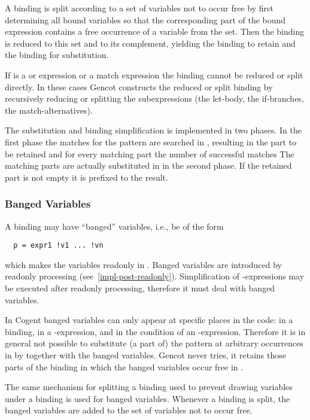 A binding is split according to a set of variables not to occur free by first determining all bound variables so that the 
corresponding part of the bound expression contains a free occurrence of a variable from the set. Then the binding is reduced
to this set and to its complement, yielding the binding to retain and the binding for substitution.

If  is a  or  expression or a match expression the binding cannot be reduced or split directly.
In these cases Gencot constructs the reduced or split binding by recursively reducing or splitting the subexpressions (the 
let-body, the if-branches, the match-alternatives).

The substitution and binding simplification is implemented in two phases. In the first phase the matches for the pattern are 
searched in , resulting in the part to be retained and for every matching part the number of successful matches
The matching parts are actually substituted in  in the second phase. If the retained part is not empty it is 
prefixed to the result.

\subsubsection{Banged Variables}

A binding may have ``banged'' variables, i.e., be of the form
\begin{verbatim}
  p = expr1 !v1 ... !vn
\end{verbatim}
which makes the variables  readonly in . Banged variables are introduced by readonly processing 
(see~\ref{impl-post-readonly}). Simplification of -expressions may be executed after readonly processing, therefore it
must deal with banged variables.

In Cogent banged variables can only appear at specific places in the code: in a  binding, in a -expression, 
and in the condition of an -expression. Therefore it is in general not possible to substitute (a part of) the pattern 
at arbitrary occurrences in  by  together with the banged variables. Gencot never tries, it retains those
parts of the binding in which the banged variables occur free in .

The same mechanism for splitting a binding used to prevent drawing variables under a binding is used for banged variables. Whenever
a binding is split, the banged variables are added to the set of variables not to occur free.

